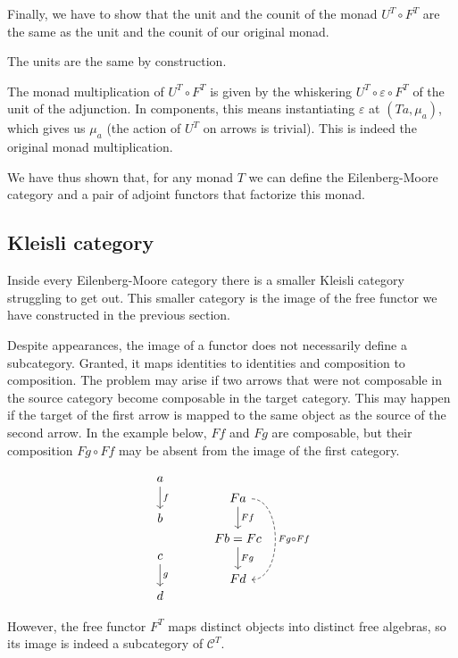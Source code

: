 \documentclass[DaoFP]{subfiles}
\begin{document}
Finally, we have to show that the unit and the counit of the monad $U^T \circ F^T$ are the same as the unit and the counit of our original monad.

The units are the same by construction.

The monad multiplication of $U^T \circ F^T$ is given by the whiskering $U^T \circ \varepsilon \circ F^T$ of the unit of the adjunction. In components, this means instantiating $\varepsilon$ at $(T a, \mu_a)$, which gives us $\mu_a$ (the action of $U^T$ on arrows is trivial). This is indeed the original monad multiplication.

We have thus shown that, for any monad $T$ we can define the Eilenberg-Moore category and a pair of adjoint functors that factorize this monad.

\subsection{Kleisli category}

Inside every Eilenberg-Moore category there is a smaller Kleisli category struggling to get out. This smaller category is the image of the free functor we have constructed in the previous section. 

Despite appearances, the image of a functor does not necessarily define a subcategory. Granted, it maps identities to identities and composition to composition. The problem may arise if two arrows that were not composable in the source category become composable in the target category. This may happen if the target of the first arrow is mapped to the same object as the source of the second arrow. In the example below, $F f$ and $F g$ are composable, but their composition $F g \circ F f$ may be absent from the image of the first category.


\[
 \begin{tikzcd}
 a
 \arrow[d, "f"]
 \\ b
 \\ c
 \arrow[d, "g"]
 \\ d
 \end{tikzcd}
  \hspace{30pt}
 \begin{tikzcd}
 F a
 \arrow[d, "F f"]
 \arrow[dd, dashed, bend left=90, "F g \circ F f"]
 \\ F b = F c
  \arrow[d, "F g"]
 \\ F d
 \end{tikzcd}
\]


However, the free functor $F^T$ maps distinct objects into distinct free algebras, so its image is indeed a subcategory of $\mathcal{C}^T$.
\end{document}
